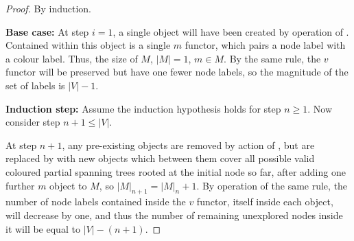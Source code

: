 \begin{proof}
By induction.

\textbf{Base case:}
At step \(i = 1\), a single \bo{} object will have been created by operation of .  Contained within this \bo{} object is a single \(m\) \gls{functor}, which pairs a node label with a colour label.  Thus, the size of \(M\), \(|M| = 1\), \(m \in M\).  By the same rule, the \(v\) functor will be preserved but have one fewer node labels, so the magnitude of the set of labels is \(|V| - 1\).

\textbf{Induction step:}
Assume the induction hypothesis holds for step \(n \geq 1\).  Now consider step \(n + 1 \leq |V|\).


At step \(n + 1\), any pre-existing \bo{} objects are removed by action of , but are replaced by  with new \bo{} objects which between them cover all possible valid coloured partial spanning trees rooted at the initial node so far, after adding one further \(m\) object to \(M\), so \(|M|_{n + 1} = |M|_{n} + 1\).  By operation of the same rule, the number of node labels contained inside the \(v\) \gls{functor}, itself inside each \bo{} object, will decrease by one, and thus the number of remaining unexplored nodes inside it will be equal to \(|V| - (n + 1)\).


\end{proof}
